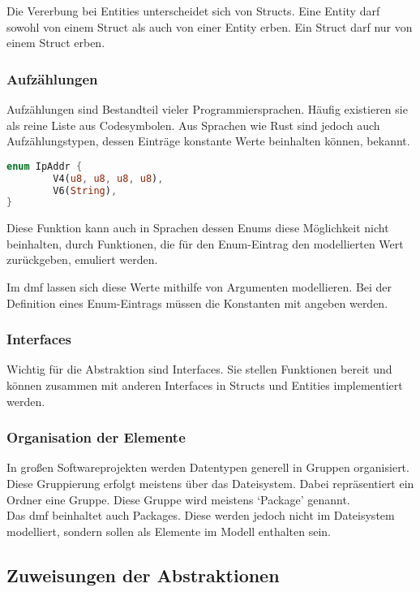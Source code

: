 \documentclass[./einleitung.tex]{subfiles}
\begin{document}
    Die Vererbung bei Entities unterscheidet sich von Structs.
    Eine Entity darf sowohl von einem Struct als auch von einer Entity erben.
    Ein Struct darf nur von einem Struct erben.

    \subsubsection{Aufzählungen}
    Aufzählungen sind Bestandteil vieler Programmiersprachen.
    Häufig existieren sie als reine Liste aus Codesymbolen.
    Aus Sprachen wie Rust sind jedoch auch Aufzählungstypen, dessen Einträge konstante Werte beinhalten können, bekannt.
    \begin{lstlisting}[language=Rust, caption=Ein Enum in Rust aus \citetitle{rustcookbook} \cite{rustcookbook}]
enum IpAddr {
        V4(u8, u8, u8, u8),
        V6(String),
}
    \end{lstlisting}

    Diese Funktion kann auch in Sprachen dessen Enums diese Möglichkeit nicht beinhalten, durch Funktionen, die für den Enum-Eintrag den modellierten Wert zurückgeben, emuliert werden.

    Im \acrshort{dmf} lassen sich diese Werte mithilfe von Argumenten modellieren.
    Bei der Definition eines Enum-Eintrags müssen die Konstanten mit angeben werden.

    \subsubsection{Interfaces}
    Wichtig für die Abstraktion sind Interfaces.
    Sie stellen Funktionen bereit und können zusammen mit anderen Interfaces in Structs und Entities implementiert werden.

    \subsubsection{Organisation der Elemente}
    In großen Softwareprojekten werden Datentypen generell in Gruppen organisiert.
    Diese Gruppierung erfolgt meistens über das Dateisystem.
    Dabei repräsentiert ein Ordner eine Gruppe.
    Diese Gruppe wird meistens `Package' genannt. \\
    Das \acrshort{dmf} beinhaltet auch Packages.
    Diese werden jedoch nicht im Dateisystem modelliert, sondern sollen als Elemente im Modell enthalten sein.

    \subsection{Zuweisungen der Abstraktionen}
\end{document}
